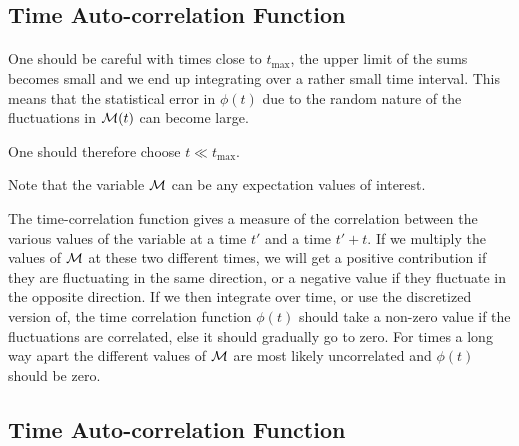 \documentclass[%
twoside,                 %
final,                   %
10pt]{article}
\begin{document}
\subsection{Time Auto-correlation Function}

\paragraph{}
One should be careful with times close to $t_{\mathrm{max}}$, the upper limit of the sums 
becomes small and we end up integrating over a rather small time interval. This means that the statistical
error in $\phi(t)$ due to the random nature of the fluctuations in ${\cal M}(t)$ can become large.

One should therefore choose $t \ll t_{\mathrm{max}}$.

Note that the variable ${\cal M}$ can be any expectation values of interest.



The time-correlation function gives a measure of the correlation between the various values of the variable 
at a time $t'$ and a time $t'+t$. If we multiply the values of ${\cal M}$ at these two different times,
we will get a positive contribution if they are fluctuating in the same direction, or a negative value
if they fluctuate in the opposite direction. If we then integrate over time, or use the discretized version of, the time correlation function $\phi(t)$ should take a non-zero value if the fluctuations are 
correlated, else it should gradually go to zero. For times a long way apart 
the different values of ${\cal M}$  are most likely 
uncorrelated and $\phi(t)$ should be zero.






\subsection{Time Auto-correlation Function}

\end{document}
